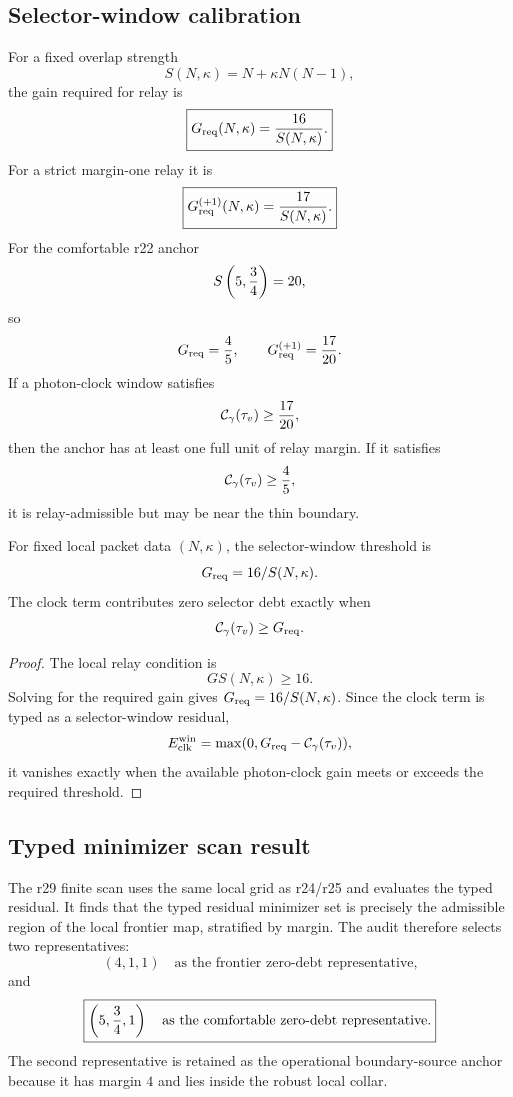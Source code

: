 \subsection{Selector-window calibration}
\label{subsec:v470-r29-selector-window-calibration}

For a fixed overlap strength
\[
S(N,\kappa)=N+\kappa N(N-1),
\]
the gain required for relay is
\[
\boxed{
G_{\rm req}(N,\kappa)={16\over S(N,\kappa)}.
}
\]
For a strict margin-one relay it is
\[
\boxed{
G_{\rm req}^{(+1)}(N,\kappa)={17\over S(N,\kappa)}.
}
\]
For the comfortable r22 anchor
\[
S\left(5,{3\over4}\right)=20,
\]
so
\[
G_{\rm req}={4\over5},
\qquad
G_{\rm req}^{(+1)}={17\over20}.
\]
If a photon-clock window satisfies
\[
\mathcal C_{\gamma}(\tau_v)\geq {17\over20},
\]
then the anchor has at least one full unit of relay margin.  If it satisfies
\[
\mathcal C_{\gamma}(\tau_v)\geq {4\over5},
\]
it is relay-admissible but may be near the thin boundary.

\begin{lemma}
\label{lem:v470-r29-selector-window-calibration}
For fixed local packet data \((N,\kappa)\), the selector-window threshold is
\[
G_{\rm req}=16/S(N,\kappa).
\]
The clock term contributes zero selector debt exactly when
\[
\mathcal C_{\gamma}(\tau_v)\geq G_{\rm req}.
\]
\end{lemma}

\begin{proof}
The local relay condition is
\[
G S(N,\kappa)\geq16.
\]
Solving for the required gain gives \(G_{\rm req}=16/S(N,\kappa)\).  Since the
clock term is typed as a selector-window residual,
\[
E_{\rm clk}^{\rm win}=\max(0,G_{\rm req}-\mathcal C_{\gamma}(\tau_v)),
\]
it vanishes exactly when the available photon-clock gain meets or exceeds the
required threshold.
\end{proof}

\subsection{Typed minimizer scan result}
\label{subsec:v470-r29-typed-minimizer-scan-result}

The r29 finite scan uses the same local grid as r24/r25 and evaluates the typed
residual.  It finds that the typed residual minimizer set is precisely the
admissible region of the local frontier map, stratified by margin.  The audit
therefore selects two representatives:
\[
\boxed{
(4,1,1)
\quad\text{as the frontier zero-debt representative,}
}
\]
and
\[
\boxed{
\left(5,{3\over4},1\right)
\quad\text{as the comfortable zero-debt representative.}
}
\]
The second representative is retained as the operational boundary-source anchor
because it has margin \(4\) and lies inside the robust local collar.

